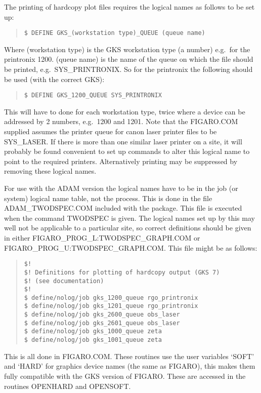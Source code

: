 The printing of hardcopy plot files requires the logical names as
follows to be set up:
\begin{quote}\begin{verbatim}
$ DEFINE GKS_(workstation type)_QUEUE (queue name)
\end{verbatim}\end{quote}
 Where (workstation type) is the GKS workstation type (a number) e.g.\
for the printronix 1200.
(queue name) is the name of the queue on which the file should be
printed, e.g.\
SYS\_PRINTRONIX. So for the printronix the following should be used
(with the correct GKS):
\begin{quote}\begin{verbatim}
$ DEFINE GKS_1200_QUEUE SYS_PRINTRONIX
\end{verbatim}\end{quote}
 This will have to done for each workstation type, twice where a device
can be addressed by 2 numbers, e.g.\ 1200 and 1201.
Note that the FIGARO.COM supplied assumes the printer queue for canon
laser printer files to be SYS\_LASER.
If there is more than one similar laser printer on a site, it will
probably be found convenient to set up commands to alter this logical
name to point to the required printers.
Alternatively printing may be suppressed by removing these logical
names.

For use with the ADAM version the logical names have to be in the job
(or system) logical name table, not the process.
This is done in the file ADAM\_TWODSPEC.COM included with the package.
This file is executed when the command TWODSPEC is given.
The logical names set up by this may well not be applicable to a
particular site, so correct definitions should be given in either
FIGARO\_PROG\_L:TWODSPEC\_GRAPH.COM or
FIGARO\_PROG\_U:TWODSPEC\_GRAPH.COM.
This file might be as follows:
\begin{quote}\begin{verbatim}
$!
$! Definitions for plotting of hardcopy output (GKS 7)
$! (see documentation)
$!
$ define/nolog/job gks_1200_queue rgo_printronix
$ define/nolog/job gks_1201_queue rgo_printronix
$ define/nolog/job gks_2600_queue obs_laser
$ define/nolog/job gks_2601_queue obs_laser
$ define/nolog/job gks_1000_queue zeta
$ define/nolog/job gks_1001_queue zeta
\end{verbatim}\end{quote}

This is all done in FIGARO.COM. These routines use the user variables
`SOFT' and `HARD' for graphics device names (the same as FIGARO),
this makes them fully compatible with the GKS version of FIGARO.
These are accessed in the routines OPENHARD and OPENSOFT.

